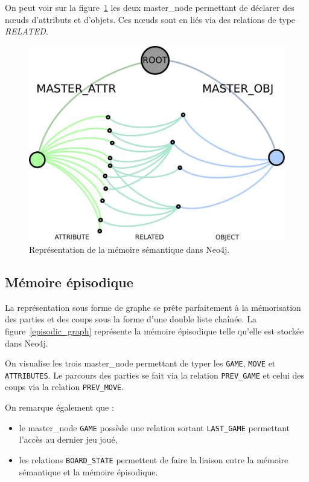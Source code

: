 On peut voir sur la figure~\ref{lattice_graph} les deux \og master\_node \fg{} permettant de déclarer des nœuds d'attributs et d'objets. Ces nœuds sont en liés via des relations de type \emph{RELATED}.

\begin{figure}[H]
\includegraphics[width=\textwidth]{files/neo4j/lattice_graph}
\caption{Représentation de la mémoire sémantique dans Neo4j.}
\label{lattice_graph}
\end{figure}

\subsection{Mémoire épisodique}

La représentation sous forme de graphe se prête parfaitement à la mémorisation des parties et des coups sous la forme d'une double liste chaînée. La figure~\ref{episodic_graph} représente la mémoire épisodique telle qu'elle est stockée dans Neo4j.

On visualise les trois \og master\_node \fg{} permettant de typer les \texttt{GAME}, \texttt{MOVE} et \texttt{ATTRIBUTES}. Le parcours des parties se fait via la relation \texttt{PREV\_GAME} et celui des coups via la relation \texttt{PREV\_MOVE}.

On remarque également que :
\begin{itemize}
\item le \og master\_node \fg{} \texttt{GAME} possède une relation sortant \texttt{LAST\_GAME} permettant l'accès au dernier jeu joué,
\item les relations \texttt{BOARD\_STATE} permettent de faire la liaison entre la mémoire sémantique et la mémoire épisodique.
\end{itemize}

